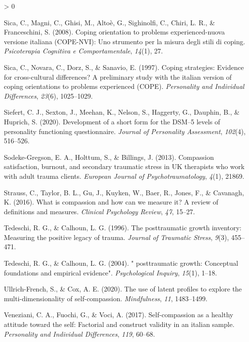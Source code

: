 \documentclass[
  english,
  man,floatsintext]{apa7}
\newlength{\cslhangindent}
\newenvironment{CSLReferences}[2] %
 {%
  \setlength{\parindent}{0pt}
  \ifodd #1 \everypar{\setlength{\hangindent}{\cslhangindent}}\ignorespaces\fi
  \ifnum #2 > 0
  \setlength{\parskip}{#2\baselineskip}
  \fi
 }%
 {}
\begin{document}
\begin{CSLReferences}{1}{0}
\leavevmode\hypertarget{ref-sica2008coping}{}%
Sica, C., Magni, C., Ghisi, M., Altoè, G., Sighinolfi, C., Chiri, L. R., \& Franceschini, S. (2008). Coping orientation to problems experienced-nuova versione italiana (COPE-NVI): Uno strumento per la misura degli stili di coping. \emph{Psicoterapia Cognitiva e Comportamentale}, \emph{14}(1), 27.

\leavevmode\hypertarget{ref-sica1997coping}{}%
Sica, C., Novara, C., Dorz, S., \& Sanavio, E. (1997). Coping strategies: Evidence for cross-cultural differences? A preliminary study with the italian version of coping orientations to problems experienced (COPE). \emph{Personality and Individual Differences}, \emph{23}(6), 1025--1029.

\leavevmode\hypertarget{ref-siefert2020development}{}%
Siefert, C. J., Sexton, J., Meehan, K., Nelson, S., Haggerty, G., Dauphin, B., \& Huprich, S. (2020). Development of a short form for the DSM--5 levels of personality functioning questionnaire. \emph{Journal of Personality Assessment}, \emph{102}(4), 516--526.

\leavevmode\hypertarget{ref-sodeke2013compassion}{}%
Sodeke-Gregson, E. A., Holttum, S., \& Billings, J. (2013). Compassion satisfaction, burnout, and secondary traumatic stress in UK therapists who work with adult trauma clients. \emph{European Journal of Psychotraumatology}, \emph{4}(1), 21869.

\leavevmode\hypertarget{ref-strauss2016compassion}{}%
Strauss, C., Taylor, B. L., Gu, J., Kuyken, W., Baer, R., Jones, F., \& Cavanagh, K. (2016). What is compassion and how can we measure it? A review of definitions and measures. \emph{Clinical Psychology Review}, \emph{47}, 15--27.

\leavevmode\hypertarget{ref-tedeschi1996posttraumatic}{}%
Tedeschi, R. G., \& Calhoun, L. G. (1996). The posttraumatic growth inventory: Measuring the positive legacy of trauma. \emph{Journal of Traumatic Stress}, \emph{9}(3), 455--471.

\leavevmode\hypertarget{ref-tedeschi2004posttraumatic}{}%
Tedeschi, R. G., \& Calhoun, L. G. (2004). " posttraumatic growth: Conceptual foundations and empirical evidence". \emph{Psychological Inquiry}, \emph{15}(1), 1--18.

\leavevmode\hypertarget{ref-ullrich2020use}{}%
Ullrich-French, S., \& Cox, A. E. (2020). The use of latent profiles to explore the multi-dimensionality of self-compassion. \emph{Mindfulness}, \emph{11}, 1483--1499.

\leavevmode\hypertarget{ref-veneziani2017self}{}%
Veneziani, C. A., Fuochi, G., \& Voci, A. (2017). Self-compassion as a healthy attitude toward the self: Factorial and construct validity in an italian sample. \emph{Personality and Individual Differences}, \emph{119}, 60--68.


\end{CSLReferences}
\end{document}
